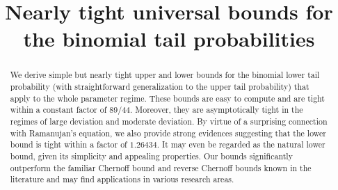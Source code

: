 \documentclass[aop]{imsart}
\theoremstyle{plain}
\theoremstyle{remark}
\newcommand{\1}{\operatorname{\uppercase\expandafter{\romannumeral1}}}
\newcommand{\2}{\operatorname{\uppercase\expandafter{\romannumeral2}}}
\newcommand{\3}{\operatorname{\uppercase\expandafter{\romannumeral3}}}
\newcommand{\4}{\operatorname{\uppercase\expandafter{\romannumeral4}}}
\newcommand{\5}{\operatorname{\uppercase\expandafter{\romannumeral5}}}
\newcommand{\6}{\operatorname{\uppercase\expandafter{\romannumeral6}}}
\newcommand{\7}{\operatorname{\uppercase\expandafter{\romannumeral7}}}
\newcommand{\8}{\operatorname{\uppercase\expandafter{\romannumeral8}}}
\newcommand{\9}{\operatorname{\uppercase\expandafter{\romannumeral9}}}
\begin{document}
\begin{frontmatter}
\title{Nearly tight universal bounds for the binomial tail probabilities}




\begin{abstract}
We derive simple but nearly tight upper and lower bounds for the binomial   lower tail probability (with straightforward generalization to the upper tail probability) that apply to the whole parameter regime. These bounds are easy to compute and are tight within a constant factor of $89/44$. Moreover, they are  asymptotically tight in the regimes of large deviation and moderate deviation. By virtue of a surprising connection with Ramanujan's equation, we also provide strong evidences  suggesting that the lower bound is 
 tight within a factor of $1.26434$. It may even be regarded as the natural lower bound, given its simplicity and appealing properties. Our bounds significantly outperform the familiar Chernoff bound and reverse Chernoff bounds known in the literature and may find applications in various research areas. 
\end{abstract}




\begin{keyword}[class=MSC]
 
\end{keyword}



\begin{keyword}
\end{keyword}

\end{frontmatter}
\end{document}
